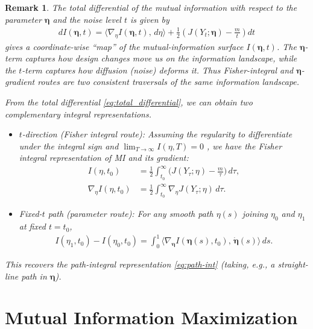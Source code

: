 \documentclass[conference]{IEEEtran}
\newtheorem{remark}{Remark}
\begin{document}
\begin{remark} \rm 
The total differential of the mutual information 
with respect to the parameter $\bm \eta$ and the noise level 
$t$ is given by
\begin{align}
dI(\bm\eta,t)
=\big\langle\nabla_\eta I(\bm\eta,t),\,d\eta\big\rangle
+\tfrac12\!\left(J(Y_t;\bm\eta)-\tfrac{m}{t}\right)dt
\label{eq:total_differential}
\end{align}
gives a coordinate-wise ``map'' of the mutual-information 
surface $I(\bm\eta,t)$.
The \(\bm \eta\)-term captures how design changes move us 
on the information landscape,
while the \(t\)-term captures how diffusion (noise) deforms it.
Thus Fisher-integral and \(\bm \eta\)-gradient routes are 
two consistent traversals
of the same information landscape.

From the total differential \eqref{eq:total_differential},
we can obtain two complementary integral representations.
\begin{itemize}
\item[(i)] {$t$-direction (Fisher integral route):}
Assuming  the regularity 
to differentiate under the integral sign and 
$\lim_{T\to\infty} I(\eta,T)=0$ , we have 
the Fisher integral representation of MI and its gradient:
\begin{align}
I(\eta,t_0)
&=\frac12\int_{t_0}^{\infty}\!\Big(J(Y_\tau;\eta)-\frac{m}{\tau}\Big)\,d\tau, \\
\nabla_\eta I(\eta,t_0)
&=\frac12\int_{t_0}^{\infty}\!\nabla_\eta J(Y_\tau;\eta)\,d\tau.
\end{align}

\item[(ii)] {Fixed-$t$ path (parameter route):}
For any smooth path $\eta(s)$ joining $\eta_0$ and $\eta_1$ at fixed $t=t_0$,
\begin{align}
I(\eta_1,t_0)-I(\eta_0,t_0)
=\int_{0}^{1}\!\big\langle \nabla_{\bm \eta} 
I(\bm \eta(s),t_0),\,\dot {\bm \eta}(s)\big\rangle\,ds.
\end{align}
\end{itemize}
This recovers the path-integral representation \eqref{eq:path-int} 
(taking, e.g., a straight-line path in $\bm \eta$).

\end{remark}


\section{Mutual Information Maximization} 
\label{sec:maximization}
\end{document}
